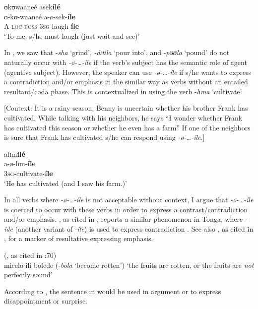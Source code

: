 \documentclass[output=paper,newtxmath,modfonts,nonflat,draftmode]{langsci/langscibook}
\begin{document}
\ea \label{ex:kanijo:29}
\ea
\glll ʊkʊwaaneé    asek\textbf{ílé}\\
  ʊ-kʊ-waaneé a-ø-sek-\textbf{íle}\\
   A-\textsc{loc}-\textsc{poss}  3\textsc{sg}-laugh-\textbf{íle}\\
  \glt ‘To me, s/he must laugh (just wait and see)’
\z
\z

In , we saw that -\textit{sha} ‘grind’, \textit{-dɪtɪla} ‘pour into’, and -\textit{pʊʊla} ‘pound’ do not naturally occur with \textit{-ø-…-íle} if the verb’s subject has the semantic role of agent (agentive subject). However, the speaker can use \textit{-ø-…-íle} if s/he wants to express a contradiction and/or emphasis in the similar way as verbs without an entailed resultant/coda phase. This is contextualized in  using the verb -\textit{lɪma} ‘cultivate’.

\ea \label{ex:kanijo:30}
[Context: It is a rainy season, Benny is uncertain whether his brother Frank has cultivated. While talking with his neighbors, he says “I wonder whether Frank has cultivated this season or whether he even has a farm” If one of the neighbors is sure that Frank has cultivated s/he can respond using \textit{-ø-…-íle}.]

\glll alɪm\textbf{ilé}\\
a-ø-lɪm-\textbf{íle}\\
3\textsc{sg}-cultivate-\textbf{íle}\\
\glt ‘He has cultivated (and I saw his farm.)’
\z

In all verbs where \textit{-ø-…-íle} is not acceptable without context, I argue that \textit{-ø-…-íle} is coerced to occur with these verbs in order to express a contrast\slash contradiction and/or emphasis. \citet{Collins1962}, as cited in \citet[70]{Crane2012}, reports a similar phenomenon in Tonga, where -\textit{ide} (another variant of -\textit{ile}) is used to express contradiction . See also \citet{Woidich1975}, as cited in \citet[194]{Ebert1995}, for a marker of resultative expressing emphasis. 

\ea \label{ex:kanijo:31}  (\citealt{Collins1962}, as cited in \citealt{Crane2012}:70)\\
micelo ili bolede (-\textit{bola} ‘become rotten’)
\glt   ‘the fruits are rotten, or the fruits are \textit{not} perfectly sound’ 
\z

According to \citet{Collins1962}, the sentence in  would be used in argument or to express disappointment or surprise. 
\end{document}
